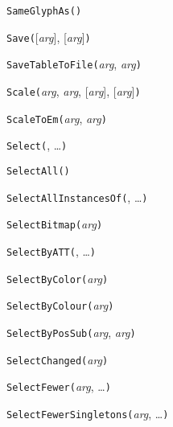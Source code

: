 \noindent\texttt{SameGlyphAs(}\texttt{)}


\noindent\texttt{Save(}[\textit{arg}], [\textit{arg}]\texttt{)}


\noindent\texttt{SaveTableToFile(}\textit{arg}, \textit{arg}\texttt{)}


\noindent\texttt{Scale(}\textit{arg}, \textit{arg}, [\textit{arg}], [\textit{arg}]\texttt{)}


\noindent\texttt{ScaleToEm(}\textit{arg}, \textit{arg}\texttt{)}


\noindent\texttt{Select(}, \ldots\texttt{)}


\noindent\texttt{SelectAll(}\texttt{)}


\noindent\texttt{SelectAllInstancesOf(}, \ldots\texttt{)}


\noindent\texttt{SelectBitmap(}\textit{arg}\texttt{)}


\noindent\texttt{SelectByATT(}, \ldots\texttt{)}


\noindent\texttt{SelectByColor(}\textit{arg}\texttt{)}


\noindent\texttt{SelectByColour(}\textit{arg}\texttt{)}


\noindent\texttt{SelectByPosSub(}\textit{arg}, \textit{arg}\texttt{)}


\noindent\texttt{SelectChanged(}\textit{arg}\texttt{)}


\noindent\texttt{SelectFewer(}\textit{arg}, \ldots\texttt{)}


\noindent\texttt{SelectFewerSingletons(}\textit{arg}, \ldots\texttt{)}


